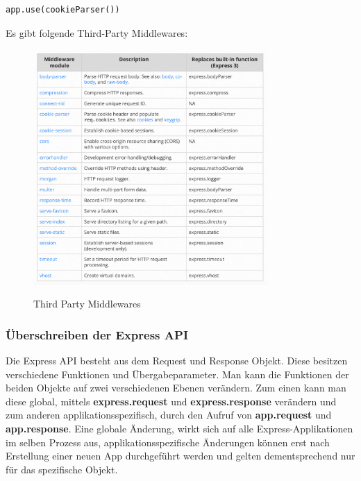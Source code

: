 \begin{itemize}
\begin{lstlisting}[caption=Third-Party Middleware]
            app.use(cookieParser())
        \end{lstlisting}
        \newpage
        Es gibt folgende Third-Party Middlewares:\newline
        \begin{figure}[h!]
            \centering
            \includegraphics[width=0.8\textwidth]{pics/Third-Party-Middleware.png}
            \caption{Third Party Middlewares}
            \cite{Express_js_third_party_middlewares}
            \label{fig:enter-label}
        \end{figure}
\end{itemize}
\cite{Express_js_writing_middleware}
\cite{Express_js_using_middleware}
\cite{Express_js_middleware_help_1}

\subsubsection{Überschreiben der Express API}
Die Express API besteht aus dem Request und Response Objekt. Diese besitzen verschiedene Funktionen und Übergabeparameter. Man kann die Funktionen der beiden Objekte auf zwei verschiedenen Ebenen verändern. Zum einen kann man diese global, mittels \textbf{express.request} und \textbf{express.response} verändern und zum anderen applikationsspezifisch, durch den Aufruf von \textbf{app.request} und \textbf{app.response}. Eine globale Änderung, wirkt sich auf alle Express-Applikationen im selben Prozess aus, applikationsspezifische Änderungen können erst nach Erstellung einer neuen App durchgeführt werden und gelten dementsprechend nur für das spezifische Objekt. 

